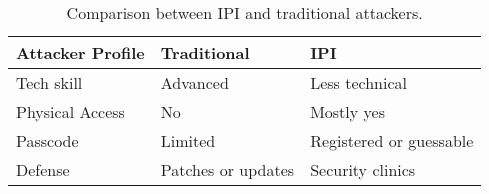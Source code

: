 



\begin{table}[t!]
    \small
    \centering
    \caption{Comparison between IPI and traditional attackers.}
    \begin{tabular}{@{}lll@{}}
        \toprule
        \textbf{Attacker Profile} & \textbf{Traditional} & \textbf{IPI} \\ 
        \midrule
        Tech skill & Advanced & Less technical \\ 
        Physical Access & No & Mostly yes \\ 
        Passcode & Limited & Registered or guessable \\
        Defense & Patches or updates & Security clinics~\cite{bellini2024abusive, tseng2022care, havron2019clinical} \\
        \bottomrule
    \end{tabular}
    \label{tab-ipvvstradition}
\end{table}

